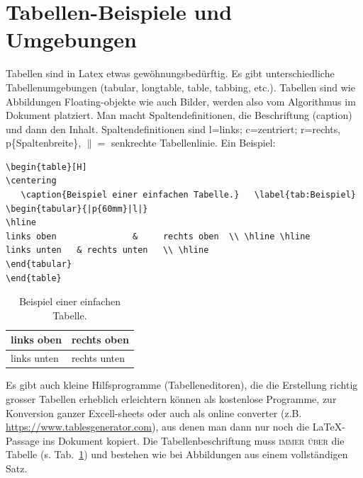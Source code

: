 \section{Tabellen-Beispiele und Umgebungen}\label{sec:Tabellen}
Tabellen sind in Latex etwas gewöhnungsbedürftig. Es gibt unterschiedliche Tabellenumgebungen (tabular, longtable, table, tabbing, etc.). Tabellen sind wie Abbildungen Floating-objekte wie auch Bilder, werden also vom Algorithmus im Dokument platziert. Man macht Spaltendefinitionen, die Beschriftung (caption) und dann den Inhalt. Spaltendefinitionen sind l=links; c=zentriert; r=rechts, p\{Spaltenbreite\}, $\|=$ senkrechte Tabellenlinie.  Ein Beispiel:%
\begin{verbatim} 
\begin{table}[H]
\centering
   \caption{Beispiel einer einfachen Tabelle.}   \label{tab:Beispiel}
\begin{tabular}{|p{60mm}|l|}
\hline
links oben               &     rechts oben  \\ \hline \hline
links unten   & rechts unten   \\ \hline
\end{tabular}
\end{table}
\end{verbatim}
\begin{table}[H]
\centering
   \caption{Beispiel einer einfachen Tabelle.}   \label{tab:Beispiel}
\begin{tabular}{|p{60mm}|l|}
\hline
links oben                 &     rechts oben  \\ \hline \hline
links unten   & rechts unten   \\ \hline
\end{tabular}
\end{table}
Es gibt auch kleine Hilfsprogramme (Tabelleneditoren), die die Erstellung richtig grosser Tabellen erheblich erleichtern können als kostenlose Programme, zur Konversion ganzer Excell-sheets oder auch als online converter (z.B. \url{https://www.tablesgenerator.com}), aus denen man dann nur noch die \LaTeX -Passage ins Dokument kopiert. Die Tabellenbeschriftung muss {\scshape\Large immer über} die Tabelle (s. Tab.~\ref{tab:Beispiel}) und bestehen wie bei Abbildungen aus einem vollständigen Satz.
